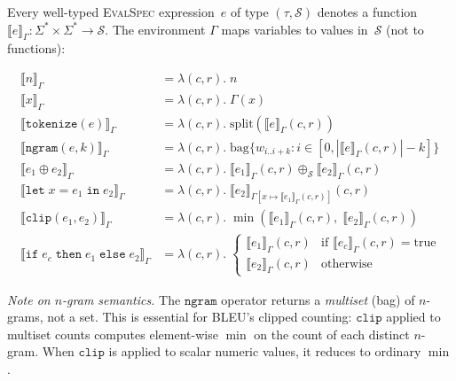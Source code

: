 \documentclass[11pt]{article}
\newcommand{\evalspec}{\textsc{EvalSpec}}
\newcommand{\semiring}[1]{\mathcal{#1}}
\begin{document}
Every well-typed \evalspec{} expression~$e$ of type $(\tau, \semiring{S})$
denotes a function $\llbracket e \rrbracket_\Gamma : \Sigma^* \times \Sigma^* \to \semiring{S}$.
The environment $\Gamma$ maps variables to values in~$\semiring{S}$
(not to functions):

\begin{align}
\llbracket n \rrbracket_\Gamma &= \lambda(c,r).\; n \label{eq:den-lit}\\
\llbracket x \rrbracket_\Gamma &= \lambda(c,r).\; \Gamma(x) \label{eq:den-var}\\
\llbracket \texttt{tokenize}(e) \rrbracket_\Gamma &= \lambda(c,r).\;
  \text{split}(\llbracket e \rrbracket_\Gamma(c,r)) \label{eq:den-tok}\\
\llbracket \texttt{ngram}(e, k) \rrbracket_\Gamma &= \lambda(c,r).\;
  \text{bag}\{w_{i..i+k} : i \in [0, |\llbracket e \rrbracket_\Gamma(c,r)| - k]\} \label{eq:den-ngram}\\
\llbracket e_1 \oplus e_2 \rrbracket_\Gamma &= \lambda(c,r).\;
  \llbracket e_1 \rrbracket_\Gamma(c,r) \oplus_{\semiring{S}}
  \llbracket e_2 \rrbracket_\Gamma(c,r) \label{eq:den-binop}\\
\llbracket \texttt{let}\;x=e_1\;\texttt{in}\;e_2 \rrbracket_\Gamma &=
  \lambda(c,r).\;
  \llbracket e_2 \rrbracket_{\Gamma[x \mapsto \llbracket e_1 \rrbracket_\Gamma(c,r)]}(c,r) \label{eq:den-let}\\
\llbracket \texttt{clip}(e_1, e_2) \rrbracket_\Gamma &= \lambda(c,r).\;
  \min(\llbracket e_1 \rrbracket_\Gamma(c,r),\;
       \llbracket e_2 \rrbracket_\Gamma(c,r)) \label{eq:den-clip}\\
\llbracket \texttt{if}\;e_c\;\texttt{then}\;e_1\;\texttt{else}\;e_2 \rrbracket_\Gamma &= \lambda(c,r).\;
  \begin{cases}
    \llbracket e_1 \rrbracket_\Gamma(c,r) & \text{if } \llbracket e_c \rrbracket_\Gamma(c,r) = \text{true} \\
    \llbracket e_2 \rrbracket_\Gamma(c,r) & \text{otherwise}
  \end{cases} \label{eq:den-if}
\end{align}

\noindent\emph{Note on $n$-gram semantics.}
The $\texttt{ngram}$ operator returns a \emph{multiset} (bag) of
$n$-grams, not a set.  This is essential for BLEU's clipped counting:
$\texttt{clip}$ applied to multiset counts computes element-wise
$\min$ on the count of each distinct $n$-gram.  When $\texttt{clip}$
is applied to scalar numeric values, it reduces to ordinary $\min$.
\end{document}
